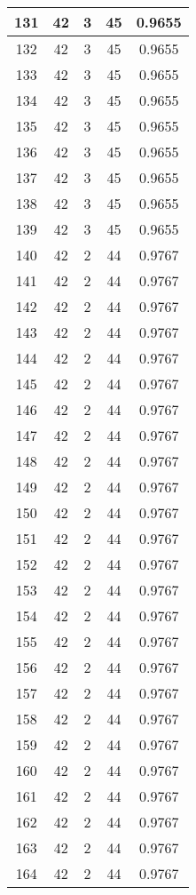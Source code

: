 \documentclass[letterpaper, 12pt]{article}
\begin{document}
\begin{longtable}{|c|c|c|c|c|}
\hline
131 & 42 & 3 & 45 & 0.9655 \\
\hline
132 & 42 & 3 & 45 & 0.9655 \\
\hline
133 & 42 & 3 & 45 & 0.9655 \\
\hline
134 & 42 & 3 & 45 & 0.9655 \\
\hline
135 & 42 & 3 & 45 & 0.9655 \\
\hline
136 & 42 & 3 & 45 & 0.9655 \\
\hline
137 & 42 & 3 & 45 & 0.9655 \\
\hline
138 & 42 & 3 & 45 & 0.9655 \\
\hline
139 & 42 & 3 & 45 & 0.9655 \\
\hline
140 & 42 & 2 & 44 & 0.9767 \\
\hline
141 & 42 & 2 & 44 & 0.9767 \\
\hline
142 & 42 & 2 & 44 & 0.9767 \\
\hline
143 & 42 & 2 & 44 & 0.9767 \\
\hline
144 & 42 & 2 & 44 & 0.9767 \\
\hline
145 & 42 & 2 & 44 & 0.9767 \\
\hline
146 & 42 & 2 & 44 & 0.9767 \\
\hline
147 & 42 & 2 & 44 & 0.9767 \\
\hline
148 & 42 & 2 & 44 & 0.9767 \\
\hline
149 & 42 & 2 & 44 & 0.9767 \\
\hline
150 & 42 & 2 & 44 & 0.9767 \\
\hline
151 & 42 & 2 & 44 & 0.9767 \\
\hline
152 & 42 & 2 & 44 & 0.9767 \\
\hline
153 & 42 & 2 & 44 & 0.9767 \\
\hline
154 & 42 & 2 & 44 & 0.9767 \\
\hline
155 & 42 & 2 & 44 & 0.9767 \\
\hline
156 & 42 & 2 & 44 & 0.9767 \\
\hline
157 & 42 & 2 & 44 & 0.9767 \\
\hline
158 & 42 & 2 & 44 & 0.9767 \\
\hline
159 & 42 & 2 & 44 & 0.9767 \\
\hline
160 & 42 & 2 & 44 & 0.9767 \\
\hline
161 & 42 & 2 & 44 & 0.9767 \\
\hline
162 & 42 & 2 & 44 & 0.9767 \\
\hline
163 & 42 & 2 & 44 & 0.9767 \\
\hline
164 & 42 & 2 & 44 & 0.9767 \\

\end{longtable}
\end{document}
